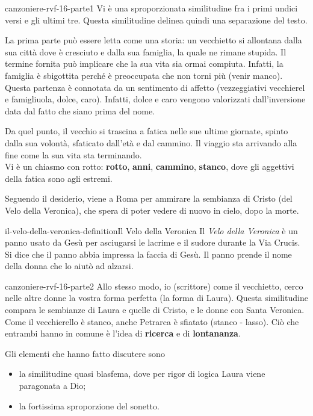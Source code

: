 \documentclass[preview]{standalone}
\begin{document}
\begin{snippet}{canzoniere-rvf-16-parte1}
    Vi è una sproporzionata similitudine fra i primi undici versi e gli ultimi tre.
    Questa similitudine delinea quindi una separazione del testo.

    La prima parte può essere letta come una storia: un vecchietto si allontana
    dalla sua città dove è cresciuto e dalla sua famiglia, la quale ne rimane stupida.
    Il termine fornita può implicare che la sua vita sia ormai compiuta.
    Infatti, la famiglia è sbigottita perché è preoccupata che non torni più (venir manco).
    Questa partenza è connotata da un sentimento di affetto (vezzeggiativi vecchierel e famigliuola, dolce, caro).
    Infatti, dolce e caro vengono valorizzati dall'inversione data dal fatto che siano prima del nome.

    Da quel punto, il vecchio si trascina a fatica nelle sue ultime giornate,
    spinto dalla sua volontà, sfaticato dall'età e dal cammino.
    Il viaggio sta arrivando alla fine come la sua vita sta terminando.\\
    Vi è un chiasmo con rotto: \textbf{rotto}, \textbf{anni}, \textbf{cammino}, \textbf{stanco},
    dove gli aggettivi della fatica sono agli estremi.

    Seguendo il desiderio, viene a Roma per ammirare la sembianza di Cristo (del Velo della Veronica),
    che spera di poter vedere di nuovo in cielo, dopo la morte.
\end{snippet}

\begin{snippetdefinition}{il-velo-della-veronica-definition}{Il Velo della Veronica}
    Il \textit{Velo della Veronica} è un panno usato da Gesù per asciugarsi le lacrime e il sudore
    durante la Via Crucis.
    Si dice che il panno abbia impressa la faccia di Gesù. Il panno prende il nome della donna che lo aiutò ad alzarsi.
\end{snippetdefinition}

\begin{snippet}{canzoniere-rvf-16-parte2}
    Allo stesso modo, io (scrittore) come il vecchietto, cerco nelle altre donne la vostra forma perfetta
    (la forma di Laura).
    Questa similitudine compara le sembianze di Laura e quelle di Cristo, e le donne con Santa Veronica.
    Come il vecchierello è stanco, anche Petrarca è sfiatato (stanco - lasso).
    Ciò che entrambi hanno in comune è l'idea di \textbf{ricerca} e di \textbf{lontananza}.

    Gli elementi che hanno fatto discutere sono
    \begin{itemize}
        \item la similitudine quasi blasfema, dove per rigor di logica Laura viene paragonata a Dio;
        \item la fortissima sproporzione del sonetto.
    \end{itemize}

\end{snippet}
\end{document}
